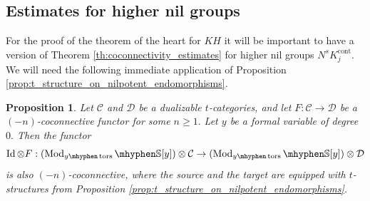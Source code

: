 \documentclass[11pt,leqno]{amsart}
\newtheorem{prop}[theo]{Proposition}
\numberwithin{equation}{section}
\def\bS{\mathbb{S}}
\newcommand{\hy}{\mhyphen}
\newcommand{\cont}{\operatorname{cont}}
\newcommand{\cD}{{\mathcal D}}
\newcommand{\cC}{{\mathcal C}}
\newcommand{\Id}{\operatorname{Id}}
\newcommand{\Sp}{\operatorname{Sp}}
\newcommand{\tors}{\operatorname{tors}}
\newcommand{\Mod}{\operatorname{Mod}}
\begin{document}
\subsection{Estimates for higher nil groups}

For the proof of the theorem of the heart for $KH$ it will be important to have a version of Theorem \ref{th:coconnectivity_estimates} for higher nil groups $N^s K_j^{\cont}.$ We will need the following immediate application of Proposition \ref{prop:t_structure_on_nilpotent_endomorphisms}.


\begin{prop}\label{prop:t_structure_on_nilpotent_endomorphisms_coconnectivity}
	Let $\cC$ and $\cD$ be a dualizable $t$-categories, and let $F:\cC\to\cD$ be a $(-n)$-coconnective functor for some $n\geq 1.$ Let $y$ be a formal variable of degree $0.$ Then the functor
	\begin{equation}\label{eq:id_otimes_F}
		\Id\otimes F:(\Mod_{y\hy\tors}\hy \bS[y])\otimes \cC\to (\Mod_{y\hy\tors}\hy \bS[y])\otimes \cD
	\end{equation} 
	is also $(-n)$-coconnective, where the source and the target are equipped with $t$-structures from Proposition \ref{prop:t_structure_on_nilpotent_endomorphisms}.
\end{prop}
\end{document}
